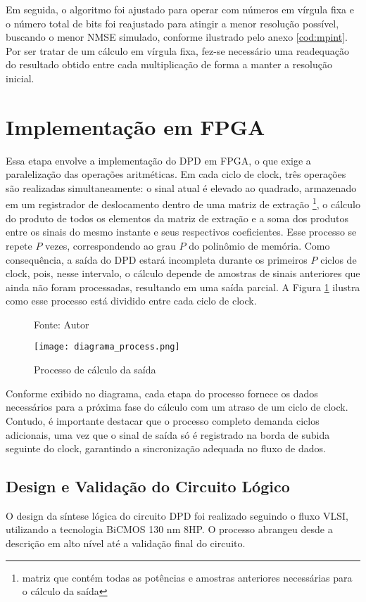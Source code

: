 Em seguida, o algoritmo foi ajustado para operar com números em vírgula fixa e o número total de bits foi reajustado para atingir a menor resolução possível, buscando o menor NMSE simulado, conforme ilustrado pelo anexo \ref{cod:mpint}. Por ser tratar de um cálculo em vírgula fixa, fez-se necessário uma readequação do resultado obtido entre cada multiplicação de forma a manter a resolução inicial.

\section{Implementação em FPGA}
Essa etapa envolve a implementação do DPD em FPGA, o que exige a paralelização das operações aritméticas. Em cada ciclo de clock, três operações são realizadas simultaneamente: o sinal atual é elevado ao quadrado, armazenado em um registrador de deslocamento dentro de uma matriz de extração \footnote{matriz que contém todas as potências e amostras anteriores necessárias para o cálculo da saída}, o cálculo do produto de todos os elementos da matriz de extração e a soma dos produtos entre os sinais do mesmo instante e seus respectivos coeficientes. Esse processo se repete \( P \) vezes, correspondendo ao grau \( P \) do polinômio de memória. Como consequência, a saída do DPD estará incompleta durante os primeiros \( P \) ciclos de clock, pois, nesse intervalo, o cálculo depende de amostras de sinais anteriores que ainda não foram processadas, resultando em uma saída parcial.
 A Figura \ref{fig:diagramaprocess} ilustra como esse processo está dividido entre cada ciclo de clock.
 
\begin{figure}[ht!]
  \centering
  \captionsetup{justification=centering}
  \caption*{Fonte: Autor}
  \texttt{[image: diagrama\_process.png]}
  \caption{Processo de cálculo da saída}
  \label{fig:diagramaprocess}
\end{figure}
Conforme exibido no diagrama, cada etapa do processo fornece os dados necessários para a próxima fase do cálculo com um atraso de um ciclo de clock. Contudo, é importante destacar que o processo completo demanda ciclos adicionais, uma vez que o sinal de saída só é registrado na borda de subida seguinte do clock, garantindo a sincronização adequada no fluxo de dados.

\subsection{Design e Validação do Circuito Lógico}  
O design da síntese lógica do circuito DPD foi realizado seguindo o fluxo VLSI, utilizando a tecnologia BiCMOS 130 nm 8HP. O processo abrangeu desde a descrição em alto nível até a validação final do circuito.  

